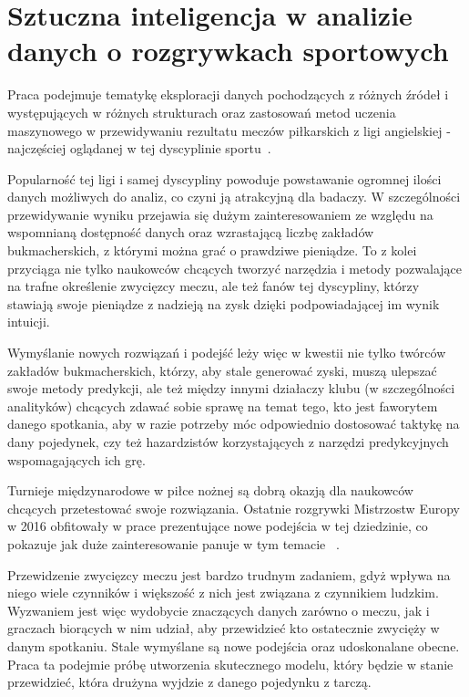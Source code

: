 
\chapter{Sztuczna inteligencja w analizie danych o rozgrywkach sportowych}

\noindent Praca podejmuje tematykę eksploracji danych pochodzących z różnych źródeł i występujących w różnych strukturach oraz zastosowań metod uczenia maszynowego w przewidywaniu rezultatu meczów piłkarskich z ligi angielskiej - najczęściej oglądanej w tej dyscyplinie sportu~\cite{ESPN}.

Popularność tej ligi i samej dyscypliny powoduje powstawanie ogromnej ilości danych możliwych do analiz, co czyni ją atrakcyjną dla badaczy. W szczególności przewidywanie wyniku przejawia się dużym zainteresowaniem ze względu na wspomnianą dostępność danych oraz wzrastającą liczbę zakładów bukmacherskich, z którymi można grać o prawdziwe pieniądze. To z kolei przyciąga nie tylko naukowców chcących tworzyć narzędzia i metody pozwalające na trafne określenie zwycięzcy meczu, ale też fanów tej dyscypliny, którzy stawiają swoje pieniądze z nadzieją na zysk dzięki podpowiadającej im wynik intuicji. 

Wymyślanie nowych rozwiązań i podejść leży więc w kwestii nie tylko twórców zakładów bukmacherskich, którzy, aby stale generować zyski, muszą ulepszać swoje metody predykcji, ale też między innymi działaczy klubu (w szczególności analityków) chcących zdawać sobie sprawę na temat tego, kto jest faworytem danego spotkania, aby w razie potrzeby móc odpowiednio dostosować taktykę na dany pojedynek, czy też hazardzistów korzystających z narzędzi predykcyjnych wspomagających ich grę.

Turnieje międzynarodowe w piłce nożnej są dobrą okazją dla naukowców chcących przetestować swoje rozwiązania. Ostatnie rozgrywki Mistrzostw Europy w 2016 obfitowały w prace prezentujące nowe podejścia w tej dziedzinie, co pokazuje jak duże zainteresowanie panuje w tym temacie~\cite{Euro2016-1} \cite{Euro2016-2}.

Przewidzenie zwycięzcy meczu jest bardzo trudnym zadaniem, gdyż wpływa na niego wiele czynników i większość z nich jest związana z czynnikiem ludzkim. Wyzwaniem jest więc wydobycie znaczących danych zarówno o meczu, jak i graczach biorących w nim udział, aby przewidzieć kto ostatecznie zwycięży w danym spotkaniu. Stale wymyślane są nowe podejścia oraz udoskonalane obecne. Praca ta podejmie próbę utworzenia skutecznego modelu, który będzie w stanie przewidzieć, która drużyna wyjdzie z danego pojedynku z tarczą. 

